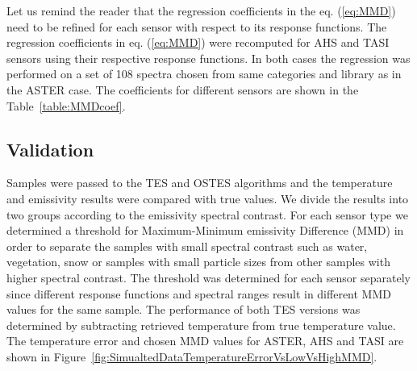Let us remind the reader that the regression coefficients in the eq. (\ref{eq:MMD}) need to be refined for each sensor with respect to its response functions. The regression coefficients in eq. (\ref{eq:MMD}) were recomputed for AHS and TASI sensors using their respective response functions. In both cases the regression was performed on a set of 108 spectra chosen from same categories and library as in the ASTER case. The coefficients for different sensors are shown in the Table~\ref{table:MMDcoef}.

\subsection*{Validation}

Samples were passed to the TES and OSTES algorithms and the temperature and emissivity results were compared with true values. We divide the results into two groups according to the emissivity spectral contrast. For each sensor type we determined a threshold for Maximum-Minimum emissivity Difference (MMD) in order to separate the samples with small spectral contrast such as water, vegetation, snow or samples with small particle sizes from other samples with higher spectral contrast. The threshold was determined for each sensor separately since different response functions and spectral ranges result in different MMD values for the same sample. The performance of both TES versions was determined by subtracting retrieved temperature from true temperature value. The temperature error and chosen MMD values for ASTER, AHS and TASI are shown in Figure~\ref{fig:SimualtedDataTemperatureErrorVsLowVsHighMMD}.

